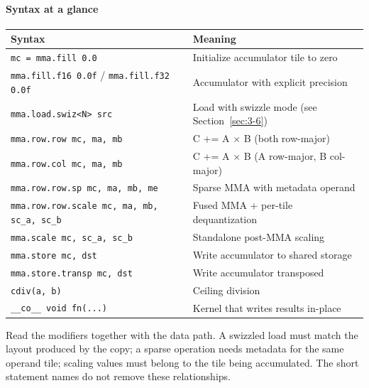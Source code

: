 \paragraph*{Syntax at a glance}

\begin{table}[htbp]
\centering\small
\begin{tabularx}{\linewidth}{@{}lX@{}}
\toprule
\textbf{Syntax} & \textbf{Meaning} \\
\midrule
\texttt{mc = mma.\allowbreak{}fill 0.\allowbreak{}0} & Initialize accumulator tile to zero \\
\texttt{mma.\allowbreak{}fill.\allowbreak{}f16 0.\allowbreak{}0f} / \texttt{mma.\allowbreak{}fill.\allowbreak{}f32 0.\allowbreak{}0f} & Accumulator with explicit precision \\
\texttt{mma.\allowbreak{}load.\allowbreak{}swiz\textless{}N\textgreater{} src} & Load with swizzle mode (see Section~\ref{sec:3-6}) \\
\texttt{mma.\allowbreak{}row.\allowbreak{}row mc, ma, mb} & C += A \(\times\) B (both row-major) \\
\texttt{mma.\allowbreak{}row.\allowbreak{}col mc, ma, mb} & C += A \(\times\) B (A row-major, B col-major) \\
\texttt{mma.\allowbreak{}row.\allowbreak{}row.\allowbreak{}sp mc, ma, mb, me} & Sparse MMA with metadata operand \\
\texttt{mma.\allowbreak{}row.\allowbreak{}row.\allowbreak{}scale mc, ma, mb, sc\_\allowbreak{}a, sc\_\allowbreak{}b} & Fused MMA + per-tile dequantization \\
\texttt{mma.\allowbreak{}scale mc, sc\_\allowbreak{}a, sc\_\allowbreak{}b} & Standalone post-MMA scaling \\
\texttt{mma.\allowbreak{}store mc, dst} & Write accumulator to shared storage \\
\texttt{mma.\allowbreak{}store.\allowbreak{}transp mc, dst} & Write accumulator transposed \\
\texttt{cdiv(a, b)} & Ceiling division \\
\texttt{\_\allowbreak{}\_\allowbreak{}co\_\allowbreak{}\_\allowbreak{} void fn(.\allowbreak{}.\allowbreak{}.\allowbreak{})} & Kernel that writes results in-place \\
\bottomrule
\end{tabularx}
\end{table}

Read the modifiers together with the data path. A swizzled load must match the layout produced by the copy; a sparse operation needs metadata for the same operand tile; scaling values must belong to the tile being accumulated. The short statement names do not remove these relationships.
